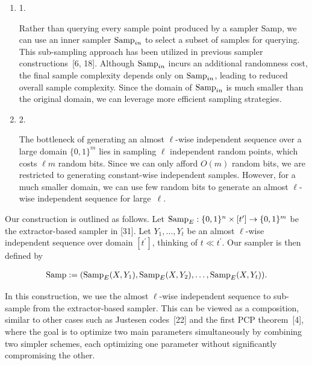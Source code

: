 \begin{enumerate}


\item[] 
1. 


Rather than querying every sample point produced by a sampler Samp, we can use an inner sampler $\textup{{Samp}}_{in}$ to select a subset of samples for querying. This sub-sampling approach has been utilized in previous sampler constructions [6, 18]. Although $\textup{{Samp}}_{in}$ incurs an additional randomness cost, the final sample complexity depends only on $\textup{{Samp}}_{in}$, leading to reduced overall sample complexity. Since the domain of $\textup{{Samp}}_{in}$ is much smaller than the original domain, we can leverage more efficient sampling strategies.\par





\item[] 
2. 


The bottleneck of generating an almost $\ell$-wise independent sequence over a large domain $\{0,1\}^{m}$ lies in sampling $\ell$ independent random points, which costs $\ell m$ random bits. Since we can only afford $O(m)$ random bits, we are restricted to generating constant-wise independent samples. However, for a much smaller domain, we can use few random bits to generate an almost $\ell$-wise independent sequence for large $\ell$.\par





\end{enumerate}




Our construction is outlined as follows.
Let $\textup{{Samp}}_{E}:\{0,1\}^{n}\times[t^{\prime}]\to\{0,1\}^{m}$ be the extractor-based sampler in [31].
Let $Y_{1},\dots,Y_{t}$ be an almost $\ell$-wise independent sequence over domain $[t^{\prime}]$, thinking of $t\ll t^{\prime}$. Our sampler is then defined by\par


\[\begin{gathered}
\textup{{Samp}}:=(\textup{{Samp}}_{E}(X,Y_{1}),\textup{{Samp}}_{E}(X,Y_{2}),\dots,\textup{{Samp}}_{E}(X,Y_{t})).
\end{gathered}\]


In this construction, we use the almost $\ell$-wise independent sequence to sub-sample from the extractor-based sampler. This can be viewed as a composition, similar to other cases such as Justesen codes [22] and the first PCP theorem [4], where the goal is to optimize two main parameters simultaneously by combining two simpler schemes, each optimizing one parameter without significantly compromising the other.\par




